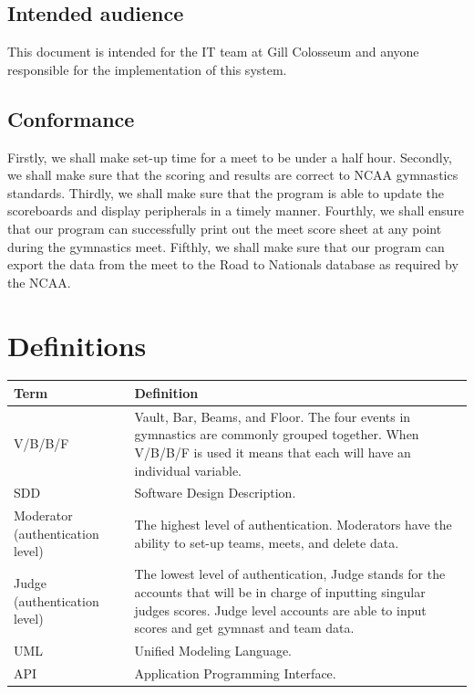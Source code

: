 \documentclass[letterpaper,10pt,draftclsnofoot,onecolumn,]{article}
\begin{document}
\subsection{Intended audience}
This document is intended for the IT team at Gill Colosseum and anyone responsible for the implementation of this system. 

\subsection{Conformance}
Firstly, we shall make set-up time for a meet to be under a half hour. Secondly, we shall make sure that the scoring and results are correct to NCAA gymnastics standards. Thirdly, we shall make sure that the program is able to update the scoreboards and display peripherals in a timely manner. Fourthly, we shall ensure that our program can successfully print out the meet score sheet at any point during the gymnastics meet. Fifthly, we shall make sure that our program can export the data from the meet to the Road to Nationals database as required by the NCAA.

\section{Definitions}
\begin{center}
    \begin{tabular} { | p{10em} | p{40em} | }
    \hline
    \textbf{Term} & \textbf{Definition} \\
    \hline
    V/B/B/F & Vault, Bar, Beams, and Floor. The four events in gymnastics are commonly grouped together. When V/B/B/F is used it means that each will have an individual variable. \\
    \hline
    SDD & Software Design Description. \\
    \hline
    Moderator (authentication level) & The highest level of authentication. Moderators have the ability to set-up teams, meets, and delete data. \\
    \hline
    Judge (authentication level) & The lowest level of authentication, Judge stands for the accounts that will be in charge of inputting singular judges scores. Judge level accounts are able to input scores and get gymnast and team data. \\
    \hline
    UML & Unified Modeling Language. \\
    \hline
    API & Application Programming Interface. \\
    \hline
    \end{tabular}
\end{center}
\end{document}

